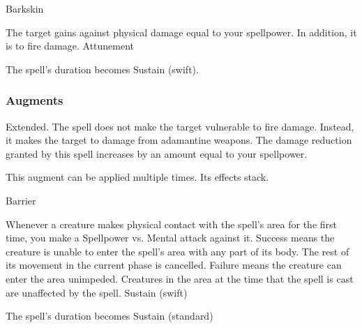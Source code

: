 \begin{spellsection}{Barkskin}
\begin{spellheader}
\end{spellheader}
\begin{spellcontent}
\begin{spelltargetinginfo}
\end{spelltargetinginfo}
\begin{spelleffects}
\spelleffect
The target gains  against physical damage equal to your spellpower.
In addition, it is  to fire damage.
\spelldur Attunement
\end{spelleffects}
\end{spellcontent}
\begin{spellfooter}
\miscastexplode
\end{spellfooter}
\begin{spellcantrip}
The spell's duration becomes Sustain (swift).
\end{spellcantrip}
\end{spellsection}
\subsubsection{Augments}
 Extended.
The spell does not make the target vulnerable to fire damage.
Instead, it makes the target  to damage from adamantine weapons.
The damage reduction granted by this spell increases by an amount equal to your spellpower.
\par
This augment can be applied multiple times.
Its effects stack.
\begin{spellsection}{Barrier}
\begin{spellcontent}
\begin{spelltargetinginfo}
\end{spelltargetinginfo}
\begin{spelleffects}
\spelleffect
Whenever a creature makes physical contact with the spell's area for the first time, you make a Spellpower vs. Mental attack against it.
Success means the creature is unable to enter the spell's area with any part of its body.
The rest of its movement in the current phase is cancelled.
Failure means the creature can enter the area unimpeded.
Creatures in the area at the time that the spell is cast are unaffected by the spell.
\spelldur Sustain (swift)
\end{spelleffects}
\end{spellcontent}
\begin{spellfooter}
\miscastexplode
\end{spellfooter}
\begin{spellcantrip}
The spell's duration becomes Sustain (standard)
\end{spellcantrip}
\end{spellsection}
